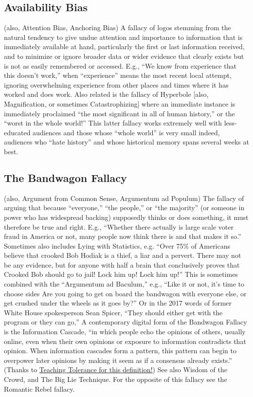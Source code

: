 \documentclass[10pt,a4paper,british]{article}
\begin{document}
\begin{multicols}{2}
    \subsection{Availability Bias} (also, Attention Bias, Anchoring Bias) A fallacy of logos stemming from the natural tendency to give undue attention and importance to information that is immediately available at hand, particularly the first or last information received, and to minimize or ignore broader data or wider evidence that clearly exists but is not as easily remembered or accessed. E.g., ``We know from experience that this doesn't work,'' when ``experience'' means the most recent local attempt, ignoring overwhelming experience from other places and times where it has worked and does work. Also related is the fallacy of Hyperbole [also, Magnification, or sometimes Catastrophizing] where an immediate instance is immediately proclaimed ``the most significant in all of human history,'' or the ``worst in the whole world!'' This latter fallacy works extremely well with less{-}educated audiences and those whose ``whole world'' is very small indeed, audiences who ``hate history'' and whose historical memory spans several weeks at best.  

    \subsection{The Bandwagon Fallacy} (also, Argument from Common Sense, Argumentum ad Populum) The fallacy of arguing that because ``everyone,'' ``the people,'' or ``the majority'' (or someone in power who has widespread backing) supposedly thinks or does something, it must therefore be true and right. E.g., ``Whether there actually is large scale voter fraud in America or not, many people now think there is and that makes it so.'' Sometimes also includes Lying with Statistics, e.g. “Over 75\% of Americans believe that crooked Bob Hodiak is a thief, a liar and a pervert. There may not be any evidence, but for anyone with half a brain that conclusively proves that Crooked Bob should go to jail! Lock him up! Lock him up!” This is sometimes combined with the ``Argumentum ad Baculum,'' e.g., ``Like it or not, it's time to choose sides Are you going to get on board  the bandwagon with everyone else, or get crushed under the wheels as it goes by?'' Or in the 2017 words of former White House spokesperson Sean Spicer, ``They should either get with the program or they can go,'' A contemporary digital form of the Bandwagon Fallacy is the Information Cascade, ``in which people echo the opinions of others, usually online, even when their own opinions or exposure to information contradicts that opinion. When information cascades form a pattern, this pattern can begin to overpower later opinions by making it seem as if a consensus already exists.'' (Thanks to \href{https://www.tolerance.org/magazine/fall-2017/speaking-of-digital-literacy}{Teaching Tolerance for this definition!}) See also Wisdom of the Crowd, and The Big Lie Technique. For the opposite of this fallacy see the Romantic Rebel fallacy.  


\end{multicols}
\end{document}
